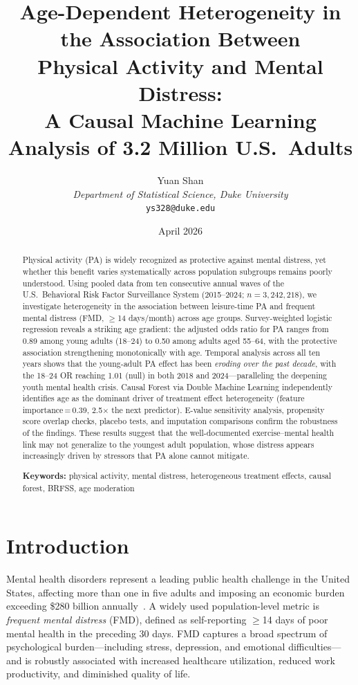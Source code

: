 \documentclass[11pt]{article}
\title{\textbf{Age-Dependent Heterogeneity in the Association Between\\
Physical Activity and Mental Distress:\\
A Causal Machine Learning Analysis of 3.2 Million U.S.\ Adults}}
\author{
  Yuan Shan\\
  \textit{Department of Statistical Science, Duke University}\\
  \texttt{ys328@duke.edu}
}
\date{April 2026}
\begin{document}
\maketitle

\begin{abstract}
\noindent
Physical activity (PA) is widely recognized as protective against mental distress, yet whether this benefit varies systematically across population subgroups remains poorly understood.
Using pooled data from ten consecutive annual waves of the U.S.\ Behavioral Risk Factor Surveillance System (2015--2024; $n = 3{,}242{,}218$), we investigate heterogeneity in the association between leisure-time PA and frequent mental distress (FMD, $\geq$14 days/month) across age groups.
Survey-weighted logistic regression reveals a striking age gradient: the adjusted odds ratio for PA ranges from 0.89 among young adults (18--24) to 0.50 among adults aged 55--64, with the protective association strengthening monotonically with age.
Temporal analysis across all ten years shows that the young-adult PA effect has been \emph{eroding over the past decade}, with the 18--24 OR reaching 1.01 (null) in both 2018 and 2024---paralleling the deepening youth mental health crisis.
Causal Forest via Double Machine Learning independently identifies age as the dominant driver of treatment effect heterogeneity (feature importance\,=\,0.39, 2.5$\times$ the next predictor).
E-value sensitivity analysis, propensity score overlap checks, placebo tests, and imputation comparisons confirm the robustness of the findings.
These results suggest that the well-documented exercise--mental health link may not generalize to the youngest adult population, whose distress appears increasingly driven by stressors that PA alone cannot mitigate.

\medskip
\noindent\textbf{Keywords:} physical activity, mental distress, heterogeneous treatment effects, causal forest, BRFSS, age moderation
\end{abstract}

\section{Introduction}
\label{sec:intro}

Mental health disorders represent a leading public health challenge in the United States, affecting more than one in five adults and imposing an economic burden exceeding \$280 billion annually~\citep{cdc_mentalhealth_2023}.
A widely used population-level metric is \emph{frequent mental distress} (FMD), defined as self-reporting $\geq$14 days of poor mental health in the preceding 30 days.
FMD captures a broad spectrum of psychological burden---including stress, depression, and emotional difficulties---and is robustly associated with increased healthcare utilization, reduced work productivity, and diminished quality of life.
\end{document}
